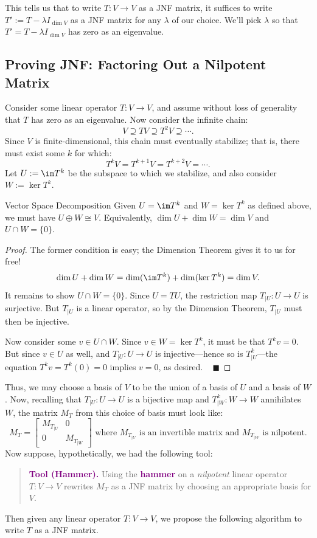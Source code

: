 This tells us that to write $T: V \to V$ as a JNF matrix, it suffices to write $T' := T - \lambda I_{\dim V}$ as a JNF matrix for any $\lambda$ of our choice.  We'll pick $\lambda$ so that $T' = T - \lambda I_{\dim V}$ has zero as an eigenvalue.

\subsection{Proving JNF: Factoring Out a Nilpotent Matrix}

Consider some linear operator $T: V \to V$, and assume without loss of generality that $T$ has zero as an eigenvalue.  Now consider the infinite chain:
\[ V \supseteq TV \supseteq T^2V \supseteq \cdots. \]
Since $V$ is finite-dimensional, this chain must eventually stabilize; that is, there must exist some $k$ for which:
\[ T^kV = T^{k + 1}V = T^{k + 2}V = \cdots. \]
Let $U := \im T^k$ be the subspace to which we stabilize, and also consider $W := \ker T^k$.

\begin{theorem}{Vector Space Decomposition}
    Given $U = \im T^k$ and $W = \ker T^k$ as defined above, we must have $U \oplus W \cong V$.  Equivalently, $\dim U + \dim W = \dim V$ and $U \cap W = \{0\}$.
\end{theorem}

\begin{proof}
    The former condition is easy; the Dimension Theorem gives it to us for free!
    \[ \dim U + \dim W = \dim (\im T^k) + \dim (\ker T^k) = \dim V. \]
    It remains to show $U \cap W = \{0\}$.  Since $U = TU$, the restriction map $T_{|U} : U \to U$ is surjective.  But $T_{|U}$ is a linear operator, so by the Dimension Theorem, $T_{|U}$ must then be injective.

    Now consider some $v \in U \cap W$.  Since $v \in W = \ker T^k$, it must be that $T^kv = 0$.  But since $v \in U$ as well, and $T_{|U}: U \to U$ is injective---hence so is $T^k_{|U}$---the equation $T^kv = T^k(0) = 0$ implies $v = 0$, as desired. ~ $\blacksquare$
\end{proof}

Thus, we may choose a basis of $V$ to be the union of a basis of $U$ and a basis of $W$.  Now, recalling that $T_{|U}: U \to U$ is a bijective map and $T^k_{|W}: W \to W$ annihilates $W$, the matrix $M_T$ from this choice of basis must look like:
\[ M_T = \begin{bmatrix} M_{T_{|U}} & 0 \\ 0 & M_{T_{|W}} \end{bmatrix} \text{ where } M_{T_{|U}} \text{ is an invertible matrix and } M_{T_{|W}} \text{ is nilpotent.} \]
Now suppose, hypothetically, we had the following tool:
\begin{quote}
    \textcolor{purple}{\textbf{Tool (Hammer).}} Using the \textcolor{purple}{\textbf{hammer}} on a \textit{nilpotent} linear operator $T: V \to V$ rewrites $M_T$ as a JNF matrix by choosing an appropriate basis for $V$.
\end{quote}
Then given any linear operator $T: V \to V$, we propose the following algorithm to write $T$ as a JNF matrix.

